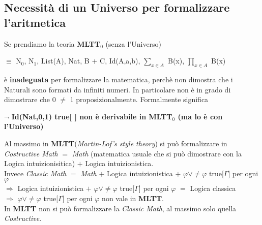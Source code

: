 \subsection{Necessit\`a di un Universo per formalizzare l'aritmetica}
\label{subsec:Necessit\`a-di-un-Universo-per-formalizzare-l'aritmetica}
Se prendiamo la teoria \textbf{MLTT$_0$} (senza l'Universo) \begin{center}$\equiv$ N$_0$, N$_1$, List(A), Nat, B $+$ C, Id(A,a,b), $\sum\limits_{x \in A}$ B(x), $\prod\limits_{x \in A}$ B(x)\end{center}
\noindent
\`e \textbf{inadeguata} per formalizzare la matematica, perch\`e non dimostra che i Naturali sono formati da infiniti numeri. In particolare non \`e in grado di dimostrare che 0 $\neq$ 1 proposizionalmente. Formalmente significa
\begin{center}\textbf{$\neg$ Id(Nat,0,1) true[ ] non \`e derivabile in MLTT$_0$ (ma lo \`e con l'Universo)}\end{center}
\noindent
Al massimo in \textbf{MLTT}(\textit{Martin-L$\ddot{o}$f's style theory}) si pu\`o formalizzare in \textit{Costructive Math} $=$ \textit{Math}  (matematica usuale che si pu\`o dimostrare con la Logica intuizionisitica) $+$ Logica intuizionistica.\\
Invece \textit{Classic Math} $=$ \textit{Math} $+$ Logica intuizionistica $+$ $\varphi \vee \neq\varphi$ true[$\Gamma$] per ogni $\varphi$\\
$\Rightarrow$ Logica intuizionistica $+$ $\varphi \vee \neq\varphi$ true[$\Gamma$] per ogni $\varphi$ $=$ Logica classica\\
$\Rightarrow$ $\varphi \vee \neq\varphi$ true[$\Gamma$] per ogni $\varphi$ non vale in \textbf{MLTT}.\\
In \textbf{MLTT} non si pu\`o formalizzare la \textit{Classic Math}, al massimo solo quella \textit{Costructive}.
